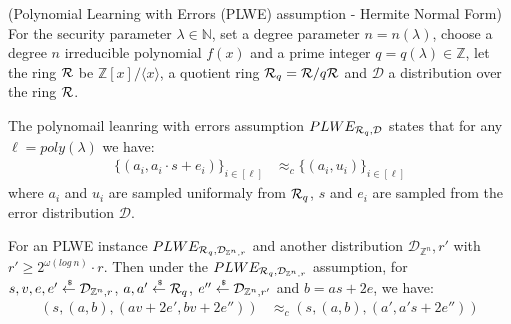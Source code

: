 \begin{definition}{(Polynomial Learning with Errors (PLWE) assumption - Hermite Normal Form)}
  For the security parameter $\lambda \in \mathbb{N}$, set a degree parameter $n = n(\lambda)$, choose a degree $n$ irreducible polynomial $f(x)$ and a prime integer $q = q(\lambda) \in \mathbb{Z}$, let the ring ${\mathcal{R}}$ be $\mathbb{Z}[x]/\langle x \rangle$, a quotient ring  ${\mathcal{R}}_q = {\mathcal{R}}/ q{\mathcal{R}}$ and $\mathcal{D}$ a distribution over the ring ${\mathcal{R}}$.

  The polynomail leanring with errors assumption $PLWE_{{\mathcal{R}}_q, \mathcal{D}}$ states that for any $\ell = poly(\lambda)$ we have:
  \begin{align*}
    \{(a_i, a_i \cdot s + e_i)\}_{i \in [\ell]} &\approx_c \{(a_i, u_i)\}_{i \in [\ell]}
  \end{align*}
  where $a_i$ and $u_i$ are sampled uniformaly from ${\mathcal{R}}_q$, $s$ and $e_i$ are sampled from the error distribution $\mathcal{D}$.

\end{definition}

\begin{lemma}
  For an PLWE instance $PLWE_{{\mathcal{R}}_q, \mathcal{D}_{\mathbb{Z}^n, r}}$ and another distribution $\mathcal{D}_{\mathbb{Z}^n},r'$ with $r' \geq 2^{\omega(log~n)} \cdot r$.
  Then under the $PLWE_{{\mathcal{R}}_q, \mathcal{D}_{\mathbb{Z}^n, r}}$ assumption, for $s, v, e, e' \stackrel{{\scriptscriptstyle \mkern4mu \$}}{\gets} \mathcal{D}_{\mathbb{Z}^n,r}$, $a, a' \stackrel{{\scriptscriptstyle \mkern4mu \$}}{\gets} {\mathcal{R}}_q$, $e'' \stackrel{{\scriptscriptstyle \mkern4mu \$}}{\gets} \mathcal{D}_{\mathbb{Z}^n, r'}$ and $b = as + 2e$,
  we have:
  \begin{align*}
    (s, (a, b), (av + 2e', bv + 2e'')) &\approx_c (s, (a,b), (a', a's+2e''))
  \end{align*}
\end{lemma}
